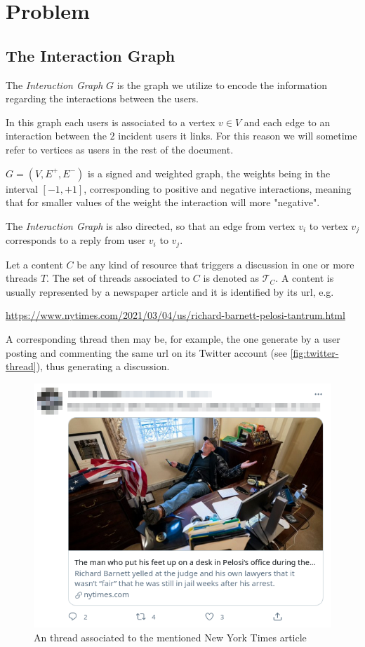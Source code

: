 \section{Problem}
\label{sec:problem}

\subsection{The Interaction Graph}
\label{sub:interaction-graph}

The \emph{Interaction Graph} $G$ is the graph we utilize to encode the
information regarding the interactions between the users.

In this graph each users is associated to a vertex $v \in V$ and each edge to
an interaction between the $2$ incident users it links. For this reason we
will sometime refer to vertices as users in the rest of the document.

$G = (V, E^{+}, E^{-})  $ is a
signed and weighted graph, the weights being in the interval $[-1, +1]$,
corresponding to positive and negative interactions, meaning that for smaller
values of the weight the interaction will more "negative".

The \emph{Interaction Graph} is also directed, so that an edge from vertex $v_{i}
$ to vertex $v_{j} $ corresponds to a reply from user $v_{i} $ to $v_{j} $.

Let a content $C$ be any kind of resource that triggers a discussion in one or
more threads $T$. The set of threads associated to $C$ is denoted as
$\mathcal{T}_{C} $. A content is usually represented by a newspaper article and
it is identified by its url, e.g.

	{\footnotesize
		\begin{center}
			\url{https://www.nytimes.com/2021/03/04/us/richard-barnett-pelosi-tantrum.html}
		\end{center}
	}

A corresponding thread then may be, for example, the one generate by a user
posting and commenting the same url on its Twitter account (see
\autoref{fig:twitter-thread}), thus generating a discussion.

\begin{figure}
	\centering
	\includegraphics[width=0.6\linewidth]{tex/img/twitter_thread.png}
	\caption[Thread-content distinction example from Twitter]{An thread associated to the mentioned New York Times article}%
	\label{fig:twitter-thread}
\end{figure}

